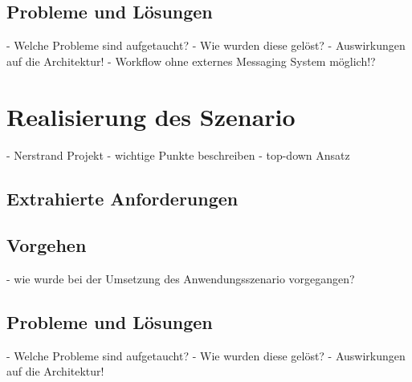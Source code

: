 \subsection{Probleme und Lösungen} %
\label{sub:probleme_und_loesungen_architektur}

  - Welche Probleme sind aufgetaucht?
  - Wie wurden diese gelöst?
  - Auswirkungen auf die Architektur!
  - Workflow ohne externes Messaging System möglich!?



\section{Realisierung des Szenario} %
\label{sec:realisierung_des_szenario}

  - Nerstrand Projekt
  - wichtige Punkte beschreiben
  - top-down Ansatz

\subsection{Extrahierte Anforderungen} %
\label{sub:extrahierte_anforderungen}


\subsection{Vorgehen} %
\label{sub:vorgehen_szenario}

  - wie wurde bei der Umsetzung des Anwendungsszenario vorgegangen?


\subsection{Probleme und Lösungen} %
\label{sub:probleme_und_loesungen_szenario}

  - Welche Probleme sind aufgetaucht?
  - Wie wurden diese gelöst?
  - Auswirkungen auf die Architektur!



